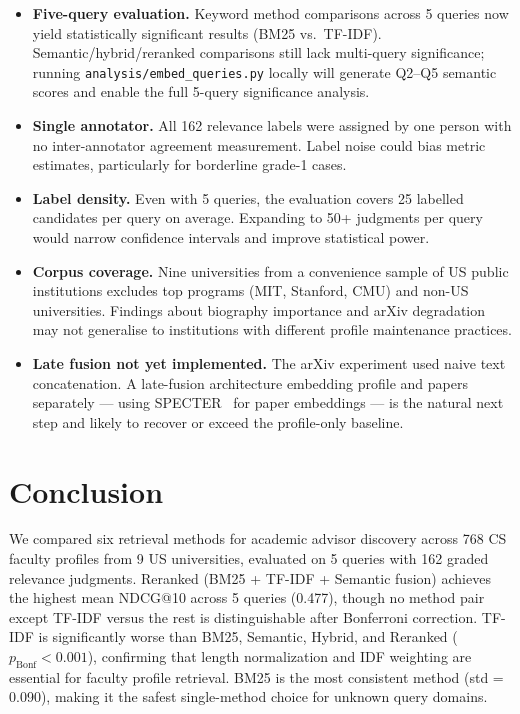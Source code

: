 \documentclass[11pt,a4paper]{article}
\begin{document}
\begin{itemize}[leftmargin=1.5em]
    \item \textbf{Five-query evaluation.}
    Keyword method comparisons across 5 queries now yield statistically
    significant results (BM25 vs.\ TF-IDF). Semantic/hybrid/reranked
    comparisons still lack multi-query significance; running
    \texttt{analysis/embed\_queries.py} locally will generate Q2--Q5
    semantic scores and enable the full 5-query significance analysis.

    \item \textbf{Single annotator.}
    All 162 relevance labels were assigned by one person with no
    inter-annotator agreement measurement. Label noise could bias metric
    estimates, particularly for borderline grade-1 cases.

    \item \textbf{Label density.}
    Even with 5 queries, the evaluation covers 25 labelled candidates per
    query on average. Expanding to 50+ judgments per query would narrow
    confidence intervals and improve statistical power.

    \item \textbf{Corpus coverage.}
    Nine universities from a convenience sample of US public institutions
    excludes top programs (MIT, Stanford, CMU) and non-US universities.
    Findings about biography importance and arXiv degradation may not
    generalise to institutions with different profile maintenance practices.

    \item \textbf{Late fusion not yet implemented.}
    The arXiv experiment used naive text concatenation. A late-fusion
    architecture embedding profile and papers separately --- using
    SPECTER~\cite{cohan2020specter} for paper embeddings --- is the
    natural next step and likely to recover or exceed the profile-only
    baseline.
\end{itemize}

\section{Conclusion}

We compared six retrieval methods for academic advisor discovery across 768 CS
faculty profiles from 9 US universities, evaluated on 5 queries with 162
graded relevance judgments.
Reranked (BM25 + TF-IDF + Semantic fusion) achieves the highest mean
NDCG@10 across 5 queries (0.477), though no method pair except TF-IDF
versus the rest is distinguishable after Bonferroni correction.
TF-IDF is significantly worse than BM25, Semantic, Hybrid, and Reranked
($p_{\text{Bonf}} < 0.001$), confirming that length normalization and
IDF weighting are essential for faculty profile retrieval.
BM25 is the most consistent method (std = 0.090), making it the
safest single-method choice for unknown query domains.
\end{document}
